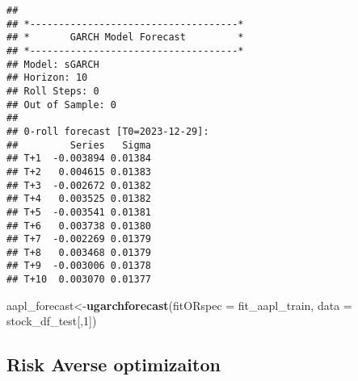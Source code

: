 \documentclass[
]{article}
\newenvironment{Shaded}{\begin{snugshade}}{\end{snugshade}}
\newcommand{\AttributeTok}[1]{\textcolor[rgb]{0.13,0.29,0.53}{#1}}
\newcommand{\DecValTok}[1]{\textcolor[rgb]{0.00,0.00,0.81}{#1}}
\newcommand{\FunctionTok}[1]{\textcolor[rgb]{0.13,0.29,0.53}{\textbf{#1}}}
\newcommand{\NormalTok}[1]{#1}
\newcommand{\OtherTok}[1]{\textcolor[rgb]{0.56,0.35,0.01}{#1}}
\begin{document}
\begin{verbatim}
## 
## *------------------------------------*
## *       GARCH Model Forecast         *
## *------------------------------------*
## Model: sGARCH
## Horizon: 10
## Roll Steps: 0
## Out of Sample: 0
## 
## 0-roll forecast [T0=2023-12-29]:
##         Series   Sigma
## T+1  -0.003894 0.01384
## T+2   0.004615 0.01383
## T+3  -0.002672 0.01382
## T+4   0.003525 0.01382
## T+5  -0.003541 0.01381
## T+6   0.003738 0.01380
## T+7  -0.002269 0.01379
## T+8   0.003468 0.01379
## T+9  -0.003006 0.01378
## T+10  0.003070 0.01377
\end{verbatim}

\begin{Shaded}
\begin{Highlighting}[]
\NormalTok{aapl\_forecast}\OtherTok{\textless{}{-}}\FunctionTok{ugarchforecast}\NormalTok{(}\AttributeTok{fitORspec =}\NormalTok{ fit\_aapl\_train, }\AttributeTok{data =}\NormalTok{ stock\_df\_test[,}\DecValTok{1}\NormalTok{])}
\end{Highlighting}
\end{Shaded}

\subsection{Risk Averse optimizaiton}\label{risk-averse-optimizaiton}
\end{document}

